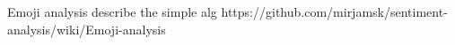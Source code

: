 Emoji analysis
describe the simple alg 
https://github.com/mirjamsk/sentiment-analysis/wiki/Emoji-analysis